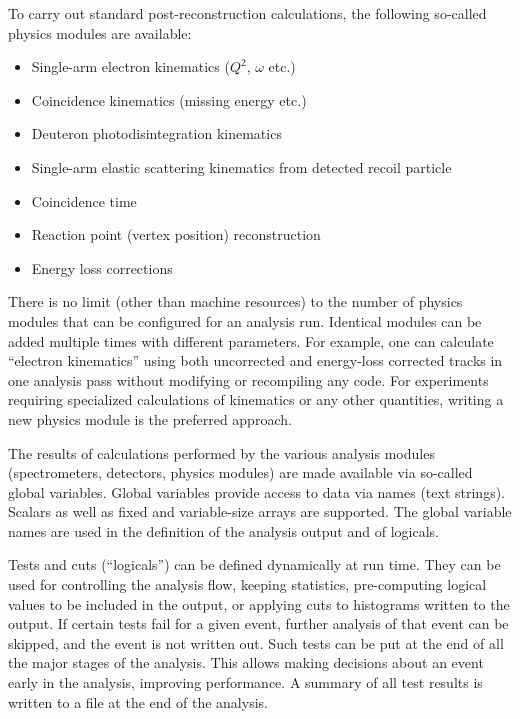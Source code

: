 {{To carry out standard post-reconstruction calculations, the following
so-called physics modules are available:
\begin{itemize} \setlength{\parskip}{0ex}
  \item Single-arm electron kinematics ($Q^2$, $\omega$ etc.)
  \item Coincidence kinematics (missing energy etc.)
  \item Deuteron photodisintegration kinematics
  \item Single-arm elastic scattering kinematics from detected recoil
          particle
  \item Coincidence time
  \item Reaction point (vertex position) reconstruction
  \item Energy loss corrections
\end{itemize}
There is no limit (other than machine resources) to the number of physics
modules that can be configured for an analysis run.
Identical modules can be added multiple times with different parameters.
For example, one can calculate ``electron kinematics'' using both uncorrected
and energy-loss corrected tracks in one analysis pass without modifying
or recompiling any code. For experiments requiring
specialized calculations of kinematics or any other quantities,
writing a new physics module is the preferred approach.

The results of calculations performed by the various analysis modules
(spectrometers, detectors, physics modules) are made available via
so-called global variables.
Global variables provide access to data via names (text strings).
Scalars as well as fixed and variable-size arrays are supported.
The global variable names are used in the definition of the analysis output
and of logicals.

Tests and cuts (``logicals'') can be defined
dynamically at run time. They can be used for controlling the analysis flow,
keeping statistics, pre-computing logical values to be included in the output,
or applying cuts to histograms written to the output.
If certain tests fail for a given event, further analysis of that
event can be skipped, and the event is not written out.  Such tests
can be put at the end of all the major stages of the analysis.  This
allows making decisions about an event early in the analysis,
improving performance.  A summary of all test results is written to a
file at the end of the analysis.

}}
